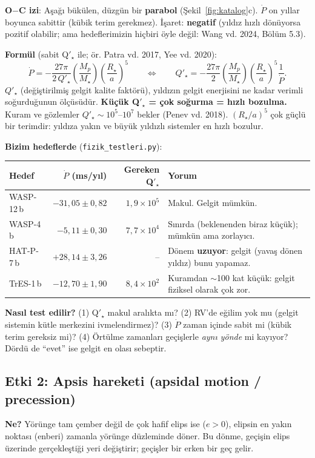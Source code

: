 \textbf{O$-$C izi}: Aşağı bükülen, düzgün bir \textbf{parabol} (Şekil~\ref{fig:katalog}c). $\dot P$ on yıllar boyunca
sabittir (kübik terim gerekmez). İşaret: \textbf{negatif} (yıldız hızlı dönüyorsa pozitif olabilir; ama hedeflerimizin
hiçbiri öyle değil: Wang vd. 2024, Bölüm 5.3).

\textbf{Formül} (sabit Q$'_\star$ ile; ör. Patra vd. 2017, Yee vd. 2020):
\[
\dot P = -\frac{27\pi}{2\,Q'_\star}\left(\frac{M_p}{M_\star}\right)\left(\frac{R_\star}{a}\right)^5
\qquad\Longleftrightarrow\qquad
Q'_\star = -\frac{27\pi}{2}\left(\frac{M_p}{M_\star}\right)\left(\frac{R_\star}{a}\right)^5\frac{1}{\dot P}.
\]
$Q'_\star$ (değiştirilmiş gelgit kalite faktörü), yıldızın gelgit enerjisini ne kadar verimli soğurduğunun ölçüsüdür.
\textbf{Küçük Q$'_\star$ = çok soğurma = hızlı bozulma.} Kuram ve gözlemler $Q'_\star \sim 10^5$–$10^7$ bekler
(Penev vd. 2018). $(R_\star/a)^5$ çok güçlü bir terimdir: yıldıza yakın ve büyük yıldızlı sistemler en hızlı bozulur.

\textbf{Bizim hedeflerde} (\texttt{fizik\_testleri.py}):
\begin{center}
\small
\begin{tabular}{l r r l}
\toprule
Hedef & $\dot P$ (ms/yıl) & Gereken Q$'_\star$ & Yorum\\
\midrule
WASP-12\,b & $-31{,}05\pm0{,}82$ & $1{,}9\times10^5$ & Makul. Gelgit mümkün.\\
WASP-4\,b  & $-5{,}11\pm0{,}30$  & $7{,}7\times10^4$ & Sınırda (beklenenden biraz küçük); mümkün ama zorlayıcı.\\
HAT-P-7\,b & $+28{,}14\pm3{,}26$ & -- & Dönem \textbf{uzuyor}: gelgit (yavaş dönen yıldız) bunu yapamaz.\\
TrES-1\,b  & $-12{,}70\pm1{,}90$ & $8{,}4\times10^2$ & Kuramdan $\sim$100 kat küçük: gelgit fiziksel olarak çok zor.\\
\bottomrule
\end{tabular}
\end{center}

\textbf{Nasıl test edilir?} (1) Q$'_\star$ makul aralıkta mı? (2) RV'de eğilim yok mu (gelgit sistemin kütle merkezini
ivmelendirmez)? (3) $\dot P$ zaman içinde sabit mi (kübik terim gereksiz mi)? (4) Örtülme zamanları geçişlerle
\emph{aynı yönde} mi kayıyor? Dördü de “evet” ise gelgit en olası sebeptir.

\subsection{Etki 2: Apsis hareketi (apsidal motion / precession)}
\textbf{Ne?} Yörünge tam çember değil de çok hafif elips ise ($e>0$), elipsin en yakın noktası (enberi) zamanla
yörünge düzleminde döner. Bu dönme, geçişin elips üzerinde gerçekleştiği yeri değiştirir; geçişler bir erken bir geç
gelir.


